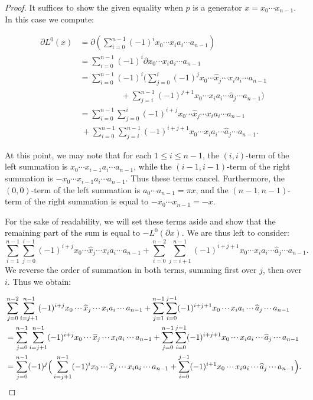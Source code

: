 \documentclass[11pt]{article}
\theoremstyle{definition}
\numberwithin{equation}{section}
\newcommand{\bd}{\partial}
\begin{document}
\begin{proof}
It suffices to show the given equality when $p$ is a generator $x = x_0 \cdots x_{n-1}$. In this case we compute:

\begin{align*}
    \bd L^0(x)  &= \bd\left( \sum_{i = 0}^{n-1} (-1)^i x_0 \cdots x_i a_i \cdots a_{n-1}\right) \\ 
     &= \sum_{i = 0}^{n-1} (-1)^i \bd x_0 \cdots x_i a_i \cdots a_{n-1} \\  
     &= \sum_{i=0}^{n-1} (-1)^{i} \bigg(\sum_{j = 0}^{i} (-1)^{j} x_0 \cdots \widehat{x}_j \cdots x_i a_i \cdots a_{n-1} \\ 
     &\qquad \qquad \quad + \sum_{j = i}^{n-1} (-1)^{j+1} x_0 \cdots x_i a_i \cdots \widehat{a}_{j} \cdots a_{n-1}\bigg) \\
     &=  \sum_{i = 0}^{n-1} \sum_{j = 0}^{i} (-1)^{i+j} x_0 \cdots \widehat{x}_j \cdots x_i a_i \cdots a_{n-1} \\
    &  \ + \sum_{i = 0}^{n-1} \sum_{j = i}^{n-1} (-1)^{i+j+1} x_0 \cdots x_i a_i \cdots \widehat{a}_{j} \cdots a_{n-1}.
\end{align*}

At this point, we may note that for each $1 \leq i \leq n - 1$, the $(i, i)$-term of the left summation is $x_0 \cdots x_{i-1} a_i \cdots a_{n-1}$, while the $(i-1,i-1)$-term of the right summation is $-x_0 \cdots x_{i-1} a_i \cdots a_{n-1}$. Thus these terms cancel. Furthermore, the $(0,0)$-term of the left summation is $a_0 \cdots a_{n-1}=\pi x$,  and the  $(n-1,n-1)$-term of the right summation is equal to $-x_0 \cdots x_{n-1} = -x$.

For the sake of readability, we will set these terms aside and show that the remaining part of the sum is equal to $-L^0(\bd x)$. We are thus left to consider:
\[
\sum_{i = 1}^{n-1} \sum_{j = 0}^{i-1}(-1)^{i+j} x_0 \cdots \widehat{x}_j \cdots x_i a_i \cdots a_{n-1} + \sum_{i = 0}^{n-2} \sum_{j = i+1}^{n-1} (-1)^{i+j+1} x_0 \cdots x_i a_i \cdots \widehat{a}_{j} \cdots a_{n-1}.
\]
We reverse the order of summation in both terms, summing first over $j$, then over $i$. Thus we obtain:


\newcommand{\cdotsThin}{\mathinner{\cdotp\mkern-1.75mu\cdotp\mkern-1.75mu\cdotp}}
\begin{align*}
& \sum_{j = 0}^{n-2} \sum_{i=j+1}^{n-1} (-1)^{i+j} x_0 \cdotsThin \widehat{x}_j \cdotsThin x_i a_i \cdotsThin a_{n-1} + \sum_{j = 1}^{n-1} \sum_{i = 0}^{j-1} (-1)^{i+j+1} x_0 \cdotsThin x_i a_i \cdotsThin \widehat{a}_{j} \cdotsThin a_{n-1} \\
&= \sum_{j = 0}^{n-1} \sum_{i=j+1}^{n-1} (-1)^{i+j} x_0 \cdotsThin \widehat{x}_j \cdotsThin x_i a_i \cdotsThin a_{n-1} + \sum_{j = 0}^{n-1} \sum_{i = 0}^{j-1} (-1)^{i+j+1} x_0 \cdotsThin x_i a_i \cdotsThin \widehat{a}_{j} \cdotsThin a_{n-1} \\
&= \sum_{j = 0}^{n-1} (-1)^j \Big(\sum_{i=j+1}^{n-1} (-1)^{i} x_0 \cdotsThin \widehat{x}_j \cdotsThin x_i a_i \cdotsThin a_{n-1} + \sum_{i = 0}^{j-1} (-1)^{i+1} x_0 \cdotsThin x_i a_i \cdotsThin \widehat{a}_{j} \cdotsThin a_{n-1}\Big).
\end{align*}


\end{proof}
\end{document}
